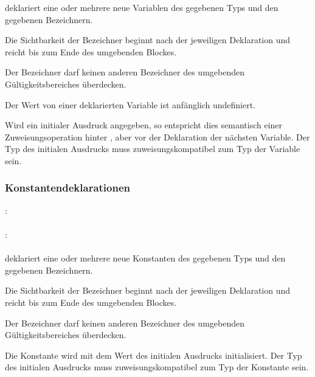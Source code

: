  deklariert eine oder mehrere neue Variablen des gegebenen Typs und den gegebenen Bezeichnern.

Die Sichtbarkeit der Bezeichner beginnt nach der jeweiligen Deklaration
und reicht bis zum Ende des umgebenden Blockes.

Der Bezeichner darf keinen anderen Bezeichner des umgebenden Gültigkeitsbereiches überdecken.

Der Wert von einer deklarierten Variable ist anfänglich undefiniert.

Wird ein initialer Ausdruck angegeben, so entspricht dies semantisch einer Zuweisungsoperation
hinter , aber vor der Deklaration der nächsten Variable.
Der Typ des initialen Ausdrucks muss zuweisungskompatibel zum Typ der Variable sein.

\subsubsection{Konstantendeklarationen}\label{Konstantendeklarationen}
:\label{dekl_konst}\\
\hspace*{1cm}\Gspace{} \Gspace{} \Gspace{}\\
:\label{dekl_konst_bzch_init}\\
\hspace*{1cm}\Gspace\Gt{=}\Gspace{} \\

 deklariert eine oder mehrere neue Konstanten des gegebenen Typs und den gegebenen Bezeichnern.

Die Sichtbarkeit der Bezeichner beginnt nach der jeweiligen Deklaration
und reicht bis zum Ende des umgebenden Blockes.

Der Bezeichner darf keinen anderen Bezeichner des umgebenden Gültigkeitsbereiches überdecken.

Die Konstante wird mit dem Wert des initialen Ausdrucks initialisiert.
Der Typ des initialen Ausdrucks muss zuweisungskompatibel zum Typ der Konstante sein.

